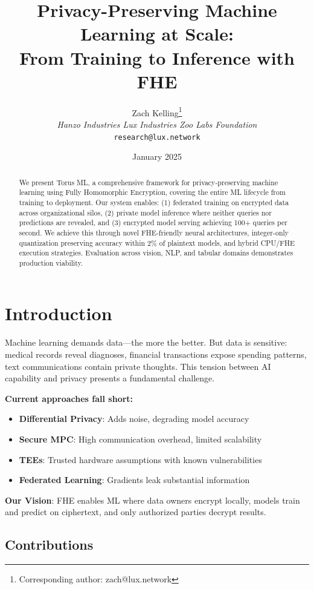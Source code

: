\documentclass{../shared/luxfhe}
\title{\textbf{Privacy-Preserving Machine Learning at Scale:\\From Training to Inference with FHE}}
\author{
    Zach Kelling\thanks{Corresponding author: zach@lux.network}\\
    \textit{Hanzo Industries \quad Lux Industries \quad Zoo Labs Foundation}\\
    \texttt{research@lux.network}
}
\date{January 2025}
\begin{document}
\maketitle
\luxcoverpage

\begin{abstract}
We present Torus ML, a comprehensive framework for privacy-preserving machine learning using Fully Homomorphic Encryption, covering the entire ML lifecycle from training to deployment. Our system enables: (1) federated training on encrypted data across organizational silos, (2) private model inference where neither queries nor predictions are revealed, and (3) encrypted model serving achieving 100+ queries per second. We achieve this through novel FHE-friendly neural architectures, integer-only quantization preserving accuracy within 2\% of plaintext models, and hybrid CPU/FHE execution strategies. Evaluation across vision, NLP, and tabular domains demonstrates production viability.
\end{abstract}

\section{Introduction}

Machine learning demands data---the more the better. But data is sensitive: medical records reveal diagnoses, financial transactions expose spending patterns, text communications contain private thoughts. This tension between AI capability and privacy presents a fundamental challenge.

\textbf{Current approaches fall short:}
\begin{itemize}[noitemsep]
    \item \textbf{Differential Privacy}: Adds noise, degrading model accuracy
    \item \textbf{Secure MPC}: High communication overhead, limited scalability
    \item \textbf{TEEs}: Trusted hardware assumptions with known vulnerabilities
    \item \textbf{Federated Learning}: Gradients leak substantial information~\cite{gradient-leakage}
\end{itemize}

\textbf{Our Vision}: FHE enables ML where data owners encrypt locally, models train and predict on ciphertext, and only authorized parties decrypt results.

\subsection{Contributions}
\end{document}
